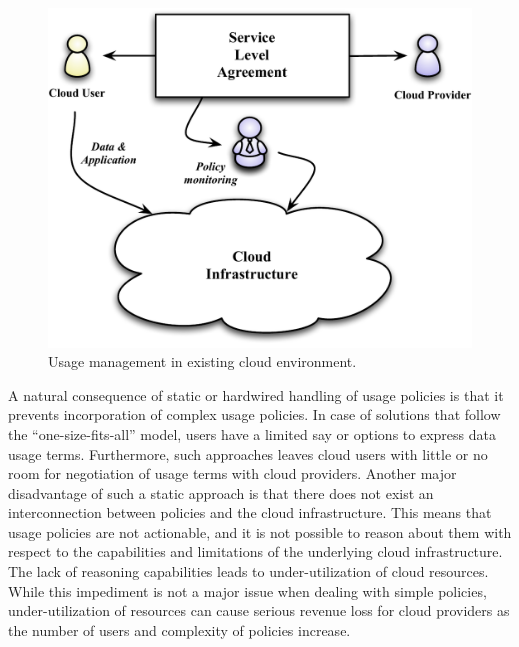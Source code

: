 \documentclass[10pt, conference, compsocconf]{IEEEtran}
\begin{document}
\begin{figure}[!t]
\centering
\includegraphics[scale=0.4]{Overview.pdf}
\caption{Usage management in existing cloud environment.}
\label{fig:overview}
\end{figure}

A natural consequence of static or hardwired handling of usage policies is that it prevents incorporation of complex usage policies. In case of solutions that follow the ``one-size-fits-all'' model, users have a limited say or options to express data usage terms. Furthermore, such approaches leaves cloud users with little or no room for negotiation of usage terms with cloud providers. Another major disadvantage of such a static approach is that there does not exist an interconnection between policies and the cloud infrastructure. This means that usage policies are not actionable, and it is not possible to reason about them with respect to the capabilities and limitations of the underlying cloud infrastructure. The lack of reasoning capabilities leads to under-utilization of cloud resources. While this impediment is not a major issue when dealing with simple policies, under-utilization of resources can cause serious revenue loss for cloud providers as the number of users and complexity of policies increase. 
\end{document}
